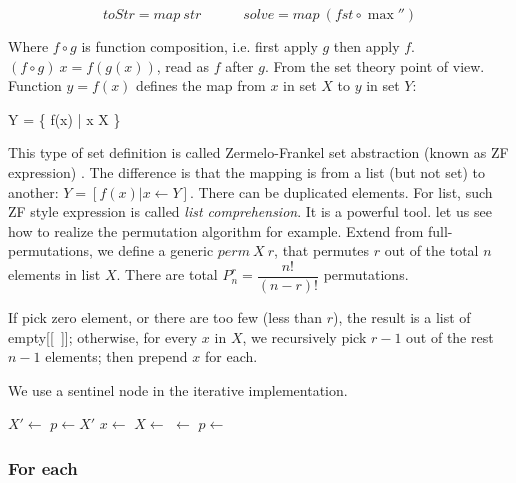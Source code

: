 \documentclass[b5paper]{article}
\begin{document}
\[
\textstyle
toStr = map\ str \quad \quad \quad
solve = map\ (fst \circ \max'')
\]

Where $f \circ g$ is function composition, i.e. first apply $g$ then apply $f$. $(f \circ g)\ x = f(g(x))$, read as $f$ after $g$. From the set theory point of view. Function $y = f(x)$ defines the map from $x$ in set $X$ to $y$ in set $Y$:

\be
Y = \{ f(x) | x \in X \}
\ee

 
This type of set definition is called Zermelo-Frankel set abstraction (known as ZF expression) \cite{algo-fp}. The difference is that the mapping is from a list (but not set) to another: $Y = [f(x) | x \gets Y]$. There can be duplicated elements. For list, such ZF style expression is called {\em list comprehension}. It is a powerful tool. let us see how to realize the permutation algorithm for example. Extend from full-permutations\cite{algo-fp}\cite{erlang}, we define a generic $perm\ X\ r$, that permutes $r$ out of the total $n$ elements in list $X$. There are total $P_n^r = \dfrac{n!}{(n-r)!}$ permutations.

\be
{}
\ee

If pick zero element, or there are too few (less than $r$), the result is a list of empty[[\ ]]; otherwise, for every $x$ in $X$, we recursively pick $r-1$ out of the rest $n-1$ elements; then prepend $x$ for each.

We use a sentinel node in the iterative  implementation.

\begin{algorithmic}[1]
  \State $X' \gets$  
  \State $p \gets X'$
    \State $x \gets$ 
    \State $X \gets$ 
    \State {} $\gets$ 
    \State $p \gets$ 
  \EndWhile
  \State \Return {} 
\EndFunction
\end{algorithmic}

\subsubsection{For each}
\end{document}
